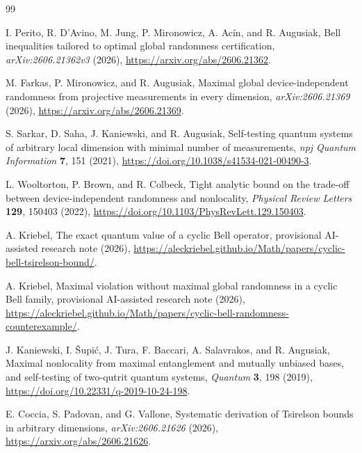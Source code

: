 \documentclass[11pt]{article}
\theoremstyle{remark}
\begin{document}
\begin{thebibliography}{99}
\raggedright

I. Perito, R. D'Avino, M. Jung, P. Mironowicz, A. Ac\'in, and R. Augusiak,
\newblock Bell inequalities tailored to optimal global randomness
certification,
\newblock \emph{arXiv:2606.21362v3} (2026),
\newblock \url{https://arxiv.org/abs/2606.21362}.

M. Farkas, P. Mironowicz, and R. Augusiak,
\newblock Maximal global device-independent randomness from projective
measurements in every dimension,
\newblock \emph{arXiv:2606.21369} (2026),
\newblock \url{https://arxiv.org/abs/2606.21369}.

S. Sarkar, D. Saha, J. Kaniewski, and R. Augusiak,
\newblock Self-testing quantum systems of arbitrary local dimension with
minimal number of measurements,
\newblock \emph{npj Quantum Information} \textbf{7}, 151 (2021),
\newblock \url{https://doi.org/10.1038/s41534-021-00490-3}.

L. Wooltorton, P. Brown, and R. Colbeck,
\newblock Tight analytic bound on the trade-off between
device-independent randomness and nonlocality,
\newblock \emph{Physical Review Letters} \textbf{129}, 150403 (2022),
\newblock \url{https://doi.org/10.1103/PhysRevLett.129.150403}.

A. Kriebel,
\newblock The exact quantum value of a cyclic Bell operator,
\newblock provisional AI-assisted research note (2026),
\newblock \url{https://aleckriebel.github.io/Math/papers/cyclic-bell-tsirelson-bound/}.

A. Kriebel,
\newblock Maximal violation without maximal global randomness in a cyclic
Bell family,
\newblock provisional AI-assisted research note (2026),
\newblock \url{https://aleckriebel.github.io/Math/papers/cyclic-bell-randomness-counterexample/}.

J. Kaniewski, I. \v{S}upi\'c, J. Tura, F. Baccari, A. Salavrakos, and
R. Augusiak,
\newblock Maximal nonlocality from maximal entanglement and mutually
unbiased bases, and self-testing of two-qutrit quantum systems,
\newblock \emph{Quantum} \textbf{3}, 198 (2019),
\newblock \url{https://doi.org/10.22331/q-2019-10-24-198}.

E. Coccia, S. Padovan, and G. Vallone,
\newblock Systematic derivation of Tsirelson bounds in arbitrary dimensions,
\newblock \emph{arXiv:2606.21626} (2026),
\newblock \url{https://arxiv.org/abs/2606.21626}.

\end{thebibliography}
\end{document}
